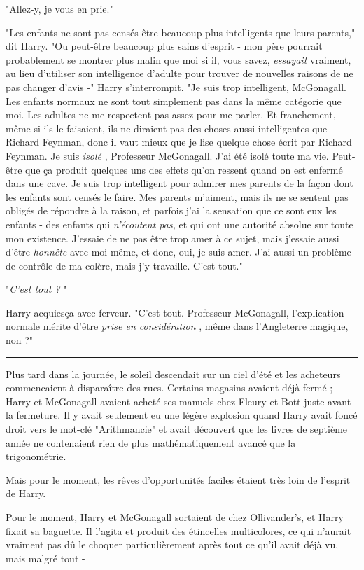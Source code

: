"Allez-y, je vous en prie."

"Les enfants ne sont pas censés être beaucoup plus intelligents que leurs parents," dit Harry. "Ou peut-être beaucoup plus sains d'esprit - mon père pourrait probablement se montrer plus malin que moi si il, vous savez, \emph{essayait}  vraiment, au lieu d'utiliser son intelligence d'adulte pour trouver de nouvelles raisons de ne pas changer d'avis -" Harry s'interrompit. "Je suis trop intelligent, McGonagall. Les enfants normaux ne sont tout simplement pas dans la même catégorie que moi. Les adultes ne me respectent pas assez pour me parler. Et franchement, même si ils le faisaient, ils ne diraient pas des choses aussi intelligentes que Richard Feynman, donc il vaut mieux que je lise quelque chose écrit par Richard Feynman. Je suis \emph{isolé} , Professeur McGonagall. J'ai été isolé toute ma vie. Peut-être que ça produit quelques uns des effets qu'on ressent quand on est enfermé dans une cave. Je suis trop intelligent pour admirer mes parents de la façon dont les enfants sont censés le faire. Mes parents m'aiment, mais ils ne se sentent pas obligés de répondre à la raison, et parfois j'ai la sensation que ce sont eux les enfants - des enfants qui \emph{n'écoutent pas,}  et qui ont une autorité absolue sur toute mon existence. J'essaie de ne pas être trop amer à ce sujet, mais j'essaie aussi d'être \emph{honnête}  avec moi-même, et donc, oui, je suis amer. J'ai aussi un problème de contrôle de ma colère, mais j'y travaille. C'est tout."

"\emph{C'est tout ?} "

Harry acquiesça avec ferveur. "C'est tout. Professeur McGonagall, l'explication normale mérite d'être \emph{prise en considération} , même dans l'Angleterre magique, non ?"
\par\noindent\rule{\textwidth}{0.4pt}
Plus tard dans la journée, le soleil descendait sur un ciel d'été et les acheteurs commencaient à disparaître des rues. Certains magasins avaient déjà fermé ; Harry et McGonagall avaient acheté ses manuels chez Fleury et Bott juste avant la fermeture. Il y avait seulement eu une légère explosion quand Harry avait foncé droit vers le mot-clé "Arithmancie" et avait découvert que les livres de septième année ne contenaient rien de plus mathématiquement avancé que la trigonométrie.

Mais pour le moment, les rêves d'opportunités faciles étaient très loin de l'esprit de Harry.

Pour le moment, Harry et McGonagall sortaient de chez Ollivander's, et Harry fixait sa baguette. Il l'agita et produit des étincelles multicolores, ce qui n'aurait vraiment pas dû le choquer particulièrement après tout ce qu'il avait déjà vu, mais malgré tout -

